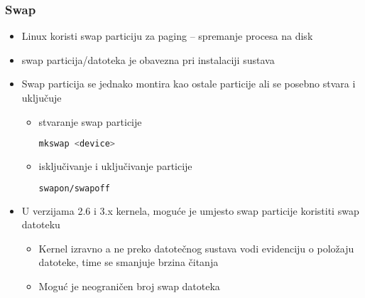 \documentclass[croatian,t]{beamer} %
\begin{document}
	\begin{frame}[fragile]
	\frametitle{Swap}
		\begin{itemize}
			\item Linux koristi swap particiju za paging – spremanje procesa na disk
			\item swap particija/datoteka je obavezna pri instalaciji sustava
			\item Swap particija se jednako montira kao ostale particije ali se posebno stvara i uključuje
			\begin{itemize}
				\item stvaranje swap particije
				\begin{lstlisting}[basicstyle={\footnotesize\ttfamily},language=bash]
				mkswap <device>
				\end{lstlisting}
				\item isključivanje i uključivanje particije
				\begin{lstlisting}[basicstyle={\footnotesize\ttfamily},language=bash]
				swapon/swapoff
				\end{lstlisting}
			\end{itemize}
			\item U verzijama 2.6 i 3.x kernela, moguće je umjesto swap particije koristiti swap datoteku
			\begin{itemize}
				\item Kernel izravno a ne preko datotečnog sustava vodi evidenciju o položaju datoteke, time se smanjuje brzina čitanja
				\item Moguć je neograničen broj swap datoteka
			\end{itemize}
		\end{itemize}
	\end{frame}
	
\end{document}
